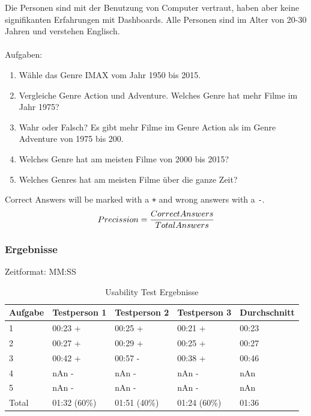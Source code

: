 \documentclass{article}
\begin{document}
\noindent
Die Personen sind mit der Benutzung von Computer vertraut, haben aber keine signifikanten Erfahrungen mit Dashboards.
Alle Personen sind im Alter von 20-30 Jahren und verstehen Englisch.\\
\\
Aufgaben:
\begin{enumerate}
    \item Wähle das Genre IMAX vom Jahr 1950 bis 2015.
    \item Vergleiche Genre Action und Adventure. Welches Genre hat mehr Filme im Jahr 1975?
    \item Wahr oder Falsch? Es gibt mehr Filme im Genre Action als im Genre Adventure von 1975 bis 200.
    \item Welches Genre hat am meisten Filme von 2000 bis 2015?
    \item Welches Genres hat am meisten Filme über die ganze Zeit?
\end{enumerate}

Correct Answers will be marked with a \texttt{+} and wrong answers with a \texttt{-}.\\

\begin{equation}
    Precission = \frac{Correct Answers}{Total Answers}\\
\end{equation}


\subsubsection{Ergebnisse}
Zeitformat: MM:SS\\
\begin{table}[!h]
    \centering
    \begin{tabular}{|l|l|l|l|l|}
    \hline
    \textbf{Aufgabe} & \textbf{Testperson 1} & \textbf{Testperson 2} & \textbf{Testperson 3} & \textbf{Durchschnitt}\\
    \hline
    1 & 00:23 + & 00:25 + & 00:21 + & 00:23\\
    \hline
    2 & 00:27 + & 00:29 + & 00:25 + & 00:27\\
    \hline
    3 & 00:42 + & 00:57 -& 00:38 + & 00:46\\
    \hline
    4 & nAn -& nAn -& nAn -& nAn\\
    \hline
    5 &nAn -& nAn -& nAn -& nAn\\
    \hline
    Total & 01:32 (60\%) & 01:51 (40\%)& 01:24 (60\%) & 01:36\\
    \hline
    \end{tabular}
    \caption{\label{tab: LE4 Usability Test}Usability Test Ergebnisse}
\end{table}
\end{document}
